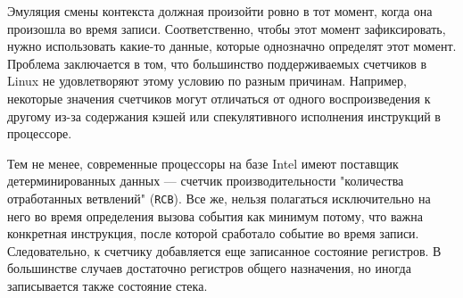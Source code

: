 Эмуляция смены контекста должная произойти ровно в тот момент, когда она произошла во время записи.
Соответственно, чтобы этот момент зафиксировать, 
нужно использовать какие-то данные, которые однозначно определят этот момент. 
Проблема заключается в том, что большинство поддерживаемых счетчиков в Linux 
не удовлетворяют этому условию по разным причинам. 
Например, некоторые значения счетчиков могут отличаться от одного воспроизведения к другому 
из-за содержания кэшей или спекулятивного исполнения инструкций в процессоре.

Тем не менее, современные процессоры на базе Intel имеют поставщик детерминированных данных — счетчик производительности 
"количества отработанных ветвлений" \@ (\texttt{RCB}). %
Все же, нельзя полагаться исключительно на него во время определения вызова события как 
минимум потому, что важна конкретная инструкция, после которой сработало событие во время записи. 
Следовательно, к счетчику добавляется еще 
записанное состояние регистров. 
В большинстве случаев достаточно регистров общего назначения, но иногда записывается также состояние стека.
